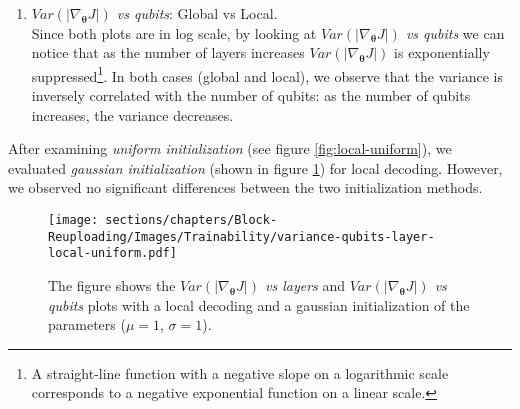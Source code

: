 \begin{enumerate}
    \item \textit{$Var(|\nabla_{\bm{\theta}}J|)$ vs qubits}: Global vs Local.\\
    Since both plots are in log scale, by looking at 
    \textit{$Var(|\nabla_{\bm{\theta}}J|)$ vs qubits} we can notice that as the number of layers increases 
    $Var(|\nabla_{\bm{\theta}}J|)$ is exponentially suppressed\footnote[1]{A straight-line function 
    with a negative slope on a logarithmic scale corresponds to a negative exponential function 
    on a linear scale.}. 
    In both cases (global and local), we observe that the variance 
    is inversely correlated with the number of qubits: as the number of qubits increases, 
    the variance decreases.
\end{enumerate}


After examining \textit{uniform initialization} (see figure \ref{fig:local-uniform}), we evaluated 
\textit{gaussian initialization} (shown in figure \ref{fig:local-gauss}) for local decoding. However, 
we observed no significant differences between the two initialization methods.


\begin{figure}[h]
    \centering
    \texttt{[image: sections/chapters/Block-Reuploading/Images/Trainability/variance-qubits-layer-local-uniform.pdf]}
    \caption{The figure shows the \textit{$Var(|\nabla_{\bm{\theta}}J|)$ vs layers} and
    \textit{$Var(|\nabla_{\bm{\theta}}J|)$ vs qubits} plots with a local decoding
    and a gaussian initialization of the parameters ($\mu = 1$, $\sigma = 1$).}
    \label{fig:local-gauss}
\end{figure}